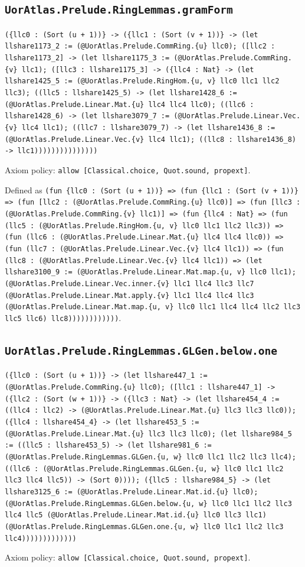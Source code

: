 \documentclass[11pt]{article}
\begin{document}
\subsection*{\texttt{UorAtlas.Prelude.RingLemmas.gramForm}}
\noindent\texttt{(\{llc0 : (Sort (u + 1))\} -> (\{llc1 : (Sort (v + 1))\} -> (let llshare1173\_2 := (@UorAtlas.Prelude.CommRing.\{u\} llc0); ([llc2 : llshare1173\_2] -> (let llshare1175\_3 := (@UorAtlas.Prelude.CommRing.\{v\} llc1); ([llc3 : llshare1175\_3] -> (\{llc4 : Nat\} -> (let llshare1425\_5 := (@UorAtlas.Prelude.RingHom.\{u, v\} llc0 llc1 llc2 llc3); ((llc5 : llshare1425\_5) -> (let llshare1428\_6 := (@UorAtlas.Prelude.Linear.Mat.\{u\} llc4 llc4 llc0); ((llc6 : llshare1428\_6) -> (let llshare3079\_7 := (@UorAtlas.Prelude.Linear.Vec.\{v\} llc4 llc1); ((llc7 : llshare3079\_7) -> (let llshare1436\_8 := (@UorAtlas.Prelude.Linear.Vec.\{v\} llc4 llc1); ((llc8 : llshare1436\_8) -> llc1)))))))))))))))}\par
\noindent Axiom policy: \texttt{allow [Classical.choice, Quot.sound, propext]}.\par
\noindent Defined as \texttt{(fun \{llc0 : (Sort (u + 1))\} => (fun \{llc1 : (Sort (v + 1))\} => (fun [llc2 : (@UorAtlas.Prelude.CommRing.\{u\} llc0)] => (fun [llc3 : (@UorAtlas.Prelude.CommRing.\{v\} llc1)] => (fun \{llc4 : Nat\} => (fun (llc5 : (@UorAtlas.Prelude.RingHom.\{u, v\} llc0 llc1 llc2 llc3)) => (fun (llc6 : (@UorAtlas.Prelude.Linear.Mat.\{u\} llc4 llc4 llc0)) => (fun (llc7 : (@UorAtlas.Prelude.Linear.Vec.\{v\} llc4 llc1)) => (fun (llc8 : (@UorAtlas.Prelude.Linear.Vec.\{v\} llc4 llc1)) => (let llshare3100\_9 := (@UorAtlas.Prelude.Linear.Mat.map.\{u, v\} llc0 llc1); (@UorAtlas.Prelude.Linear.Vec.inner.\{v\} llc1 llc4 llc3 llc7 (@UorAtlas.Prelude.Linear.Mat.apply.\{v\} llc1 llc4 llc4 llc3 (@UorAtlas.Prelude.Linear.Mat.map.\{u, v\} llc0 llc1 llc4 llc4 llc2 llc3 llc5 llc6) llc8))))))))))))}.\par
\subsection*{\texttt{UorAtlas.Prelude.RingLemmas.GLGen.below.one}}
\noindent\texttt{(\{llc0 : (Sort (u + 1))\} -> (let llshare447\_1 := (@UorAtlas.Prelude.CommRing.\{u\} llc0); ([llc1 : llshare447\_1] -> (\{llc2 : (Sort (w + 1))\} -> (\{llc3 : Nat\} -> (let llshare454\_4 := ((llc4 : llc2) -> (@UorAtlas.Prelude.Linear.Mat.\{u\} llc3 llc3 llc0)); (\{llc4 : llshare454\_4\} -> (let llshare453\_5 := (@UorAtlas.Prelude.Linear.Mat.\{u\} llc3 llc3 llc0); (let llshare984\_5 := ((llc5 : llshare453\_5) -> (let llshare981\_6 := (@UorAtlas.Prelude.RingLemmas.GLGen.\{u, w\} llc0 llc1 llc2 llc3 llc4); ((llc6 : (@UorAtlas.Prelude.RingLemmas.GLGen.\{u, w\} llc0 llc1 llc2 llc3 llc4 llc5)) -> (Sort 0)))); (\{llc5 : llshare984\_5\} -> (let llshare3125\_6 := (@UorAtlas.Prelude.Linear.Mat.id.\{u\} llc0); (@UorAtlas.Prelude.RingLemmas.GLGen.below.\{u, w\} llc0 llc1 llc2 llc3 llc4 llc5 (@UorAtlas.Prelude.Linear.Mat.id.\{u\} llc0 llc3 llc1) (@UorAtlas.Prelude.RingLemmas.GLGen.one.\{u, w\} llc0 llc1 llc2 llc3 llc4)))))))))))))}\par
\noindent Axiom policy: \texttt{allow [Classical.choice, Quot.sound, propext]}.\par
\end{document}
